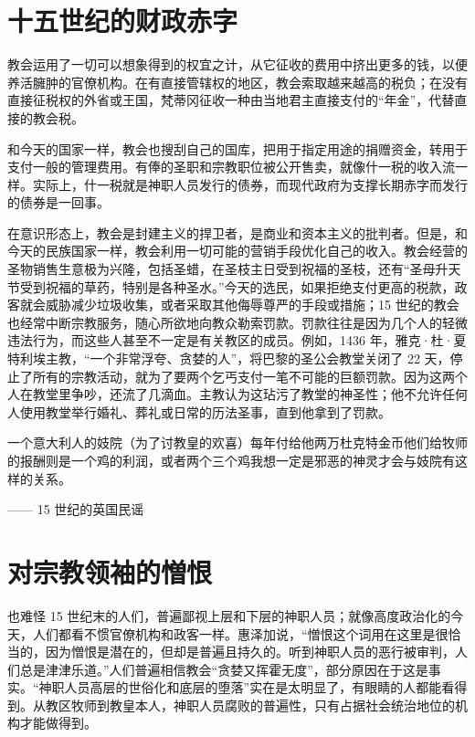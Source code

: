 \section{十五世纪的财政赤字}
教会运用了一切可以想象得到的权宜之计，从它征收的费用中挤出更多的钱，以便养活臃肿的官僚机构。在有直接管辖权的地区，教会索取越来越高的税负；在没有直接征税权的外省或王国，梵蒂冈征收一种由当地君主直接支付的“年金”，代替直接的教会税。

和今天的国家一样，教会也搜刮自己的国库，把用于指定用途的捐赠资金，转用于支付一般的管理费用。有俸的圣职和宗教职位被公开售卖，就像什一税的收入流一样。实际上，什一税就是神职人员发行的债券，而现代政府为支撑长期赤字而发行的债券是一回事。

在意识形态上，教会是封建主义的捍卫者，是商业和资本主义的批判者。但是，和今天的民族国家一样，教会利用一切可能的营销手段优化自己的收入。教会经营的圣物销售生意极为兴隆，包括圣蜡，在圣枝主日受到祝福的圣枝，还有“圣母升天节受到祝福的草药，特别是各种圣水。”今天的选民，如果拒绝支付更高的税款，政客就会威胁减少垃圾收集，或者采取其他侮辱尊严的手段或措施；15 世纪的教会也经常中断宗教服务，随心所欲地向教众勒索罚款。罚款往往是因为几个人的轻微违法行为，而这些人甚至不一定是有关教区的成员。例如，1436 年，雅克·杜·夏特利埃主教，“一个非常浮夸、贪婪的人”，将巴黎的圣公会教堂关闭了 22 天，停止了所有的宗教活动，就为了要两个乞丐支付一笔不可能的巨额罚款。因为这两个人在教堂里争吵，还流了几滴血。主教认为这玷污了教堂的神圣性；他不允许任何人使用教堂举行婚礼、葬礼或日常的历法圣事，直到他拿到了罚款。

\begin{tcolorbox}
一个意大利人的妓院（为了讨教皇的欢喜）每年付给他两万杜克特金币他们给牧师的报酬则是一个鸡的利润，或者两个三个鸡我想一定是邪恶的神灵才会与妓院有这样的关系。
\begin{flushright}
—— 15 世纪的英国民谣
\end{flushright}
\end{tcolorbox}

\section{对宗教领袖的憎恨}
也难怪 15 世纪末的人们，普遍鄙视上层和下层的神职人员；就像高度政治化的今天，人们都看不惯官僚机构和政客一样。惠泽加说，“憎恨这个词用在这里是很恰当的，因为憎恨是潜在的，但却是普遍且持久的。听到神职人员的恶行被审判，人们总是津津乐道。”人们普遍相信教会“贪婪又挥霍无度”，部分原因在于这是事实。“神职人员高层的世俗化和底层的堕落”实在是太明显了，有眼睛的人都能看得到。从教区牧师到教皇本人，神职人员腐败的普遍性，只有占据社会统治地位的机构才能做得到。

